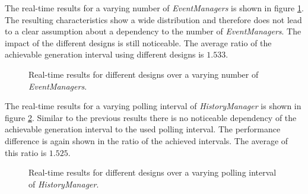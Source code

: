 The real-time results for a varying number of \emph{EventManagers} is shown in figure \ref{fig:results_realtime_eventmanager}.
The resulting characteristics show a wide distribution and therefore does not lead to a clear assumption about a dependency to the number of \emph{EventManagers}.
The impact of the different designs is still noticeable.
The average ratio of the achievable generation interval using different designs is $1.533$.
\\

\begin{figure}
    \centering
    \caption{Real-time results for different designs over a varying number of \emph{EventManagers}.}
    \label{fig:results_realtime_eventmanager}
\end{figure}

The real-time results for a varying polling interval of \emph{HistoryManager} is shown in figure \ref{fig:results_realtime_polling}.
Similar to the previous results there is no noticeable dependency of the achievable generation interval to the used polling interval.
The performance difference is again shown in the ratio of the achieved intervals.
The average of this ratio is $1.525$.
\\

\begin{figure}
    \centering
    \caption{Real-time results for different designs over a varying polling interval of \emph{HistoryManager}.}
    \label{fig:results_realtime_polling}
\end{figure}


